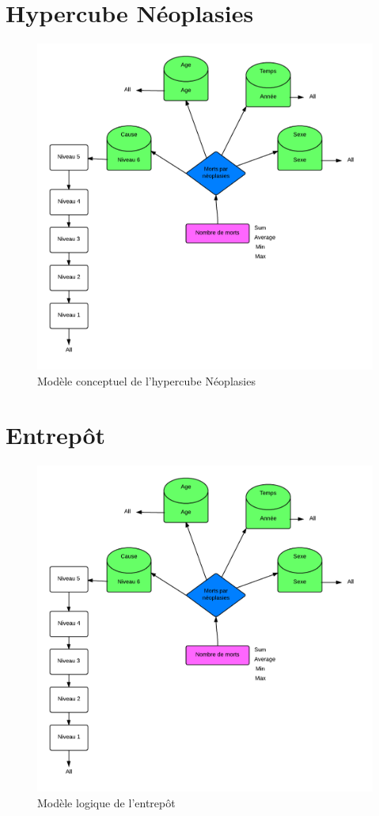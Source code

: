 \section{Hypercube Néoplasies}
\begin{figure}[h!]
    \centering
    \includegraphics[width=\linewidth]{images/cubeNeo.png}
    \caption{Modèle conceptuel de l'hypercube Néoplasies}
    \label{conception_cube_néoplasies}
\end{figure}

\section{Entrepôt}
\begin{figure}[h!]
    \centering
    \includegraphics[width=\linewidth]{images/cubeNeo.png}
    \caption{Modèle logique de l'entrepôt}
    \label{conception_cube_néoplasies}
\end{figure}


